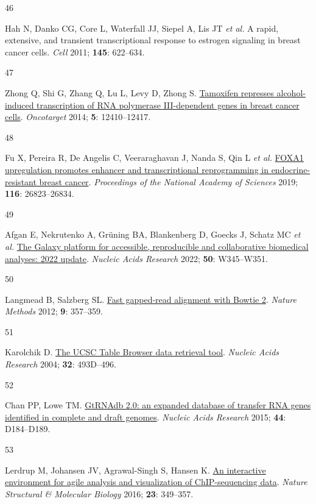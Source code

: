\documentclass[
  11pt,
]{article}
\newlength{\cslhangindent}
\newlength{\csllabelwidth}
\newlength{\cslentryspacingunit} %
\newenvironment{CSLReferences}[2] %
 {%
  \setlength{\parindent}{0pt}
  \ifodd #1
  \let\oldpar\par
  \def\par{\hangindent=\cslhangindent\oldpar}
  \fi
  \setlength{\parskip}{#2\cslentryspacingunit}
 }%
 {}
\newcommand{\CSLLeftMargin}[1]{\parbox[t]{\csllabelwidth}{#1}}
\newcommand{\CSLRightInline}[1]{\parbox[t]{\linewidth - \csllabelwidth}{#1}\break}
\begin{document}
\begin{CSLReferences}{0}{0}
\leavevmode{}%
\CSLLeftMargin{46 }%
\CSLRightInline{Hah N, Danko CG, Core L, Waterfall JJ, Siepel A, Lis JT \emph{et al.} A rapid, extensive, and transient transcriptional response to estrogen signaling in breast cancer cells. \emph{Cell} 2011; \textbf{145}: 622--634.}

\leavevmode{}%
\CSLLeftMargin{47 }%
\CSLRightInline{Zhong Q, Shi G, Zhang Q, Lu L, Levy D, Zhong S. \href{https://doi.org/10.18632/oncotarget.2678}{Tamoxifen represses alcohol-induced transcription of RNA polymerase III-dependent genes in breast cancer cells}. \emph{Oncotarget} 2014; \textbf{5}: 12410--12417.}

\leavevmode{}%
\CSLLeftMargin{48 }%
\CSLRightInline{Fu X, Pereira R, De Angelis C, Veeraraghavan J, Nanda S, Qin L \emph{et al.} \href{https://doi.org/10.1073/pnas.1911584116}{FOXA1 upregulation promotes enhancer and transcriptional reprogramming in endocrine-resistant breast cancer}. \emph{Proceedings of the National Academy of Sciences} 2019; \textbf{116}: 26823--26834.}

\leavevmode{}%
\CSLLeftMargin{49 }%
\CSLRightInline{Afgan E, Nekrutenko A, Grüning BA, Blankenberg D, Goecks J, Schatz MC \emph{et al.} \href{https://doi.org/10.1093/nar/gkac247}{The Galaxy platform for accessible, reproducible and collaborative biomedical analyses: 2022 update}. \emph{Nucleic Acids Research} 2022; \textbf{50}: W345--W351.}

\leavevmode{}%
\CSLLeftMargin{50 }%
\CSLRightInline{Langmead B, Salzberg SL. \href{https://doi.org/10.1038/nmeth.1923}{Fast gapped-read alignment with Bowtie 2}. \emph{Nature Methods} 2012; \textbf{9}: 357--359.}

\leavevmode{}%
\CSLLeftMargin{51 }%
\CSLRightInline{Karolchik D. \href{https://doi.org/10.1093/nar/gkh103}{The UCSC Table Browser data retrieval tool}. \emph{Nucleic Acids Research} 2004; \textbf{32}: 493D--496.}

\leavevmode{}%
\CSLLeftMargin{52 }%
\CSLRightInline{Chan PP, Lowe TM. \href{https://doi.org/10.1093/nar/gkv1309}{GtRNAdb 2.0: an expanded database of transfer RNA genes identified in complete and draft genomes}. \emph{Nucleic Acids Research} 2015; \textbf{44}: D184--D189.}

\leavevmode{}%
\CSLLeftMargin{53 }%
\CSLRightInline{Lerdrup M, Johansen JV, Agrawal-Singh S, Hansen K. \href{https://doi.org/10.1038/nsmb.3180}{An interactive environment for agile analysis and visualization of ChIP-sequencing data}. \emph{Nature Structural \& Molecular Biology} 2016; \textbf{23}: 349--357.}


\end{CSLReferences}
\end{document}
